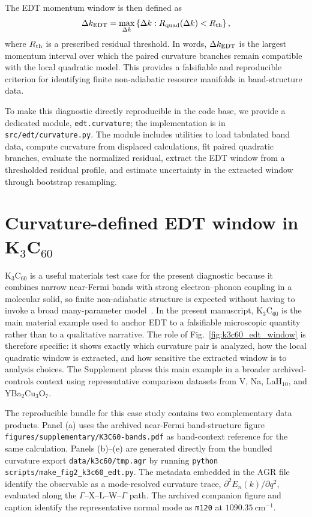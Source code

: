 \documentclass[twocolumn,10pt]{article}
\begin{document}
The EDT momentum window is then defined as
\begin{equation}
\Delta k_{\rm EDT}
=
\max_{\Delta k}
\left\{
\Delta k:
R_{\rm quad}(\Delta k)<R_{\rm th}
\right\},
\end{equation}
where $R_{\rm th}$ is a prescribed residual threshold. In words, $\Delta k_{\rm EDT}$ is the largest momentum interval over which the paired curvature branches remain compatible with the local quadratic model. This provides a falsifiable and reproducible criterion for identifying finite non-adiabatic resource manifolds in band-structure data.

To make this diagnostic directly reproducible in the code base, we provide a dedicated module, \texttt{edt.curvature}; the implementation is in \texttt{src/edt/curvature.py}. The module includes utilities to load tabulated band data, compute curvature from displaced calculations, fit paired quadratic branches, evaluate the normalized residual, extract the EDT window from a thresholded residual profile, and estimate uncertainty in the extracted window through bootstrap resampling.


\section{Curvature-defined EDT window in K$_3$C$_{60}$}

K$_3$C$_{60}$ is a useful materials test case for the present diagnostic because it combines narrow near-Fermi bands with strong electron--phonon coupling in a molecular solid, so finite non-adiabatic structure is expected without having to invoke a broad many-parameter model~\cite{Gunnarsson1997,Capone2009}. In the present manuscript, K$_3$C$_{60}$ is the main material example used to anchor EDT to a falsifiable microscopic quantity rather than to a qualitative narrative. The role of Fig.~\ref{fig:k3c60_edt_window} is therefore specific: it shows exactly which curvature pair is analyzed, how the local quadratic window is extracted, and how sensitive the extracted window is to analysis choices. The Supplement places this main example in a broader archived-controls context using representative comparison datasets from V, Na, LaH$_{10}$, and YBa$_2$Cu$_3$O$_7$.

The reproducible bundle for this case study contains two complementary data products. Panel (a) uses the archived near-Fermi band-structure figure \texttt{figures/supplementary/K3C60-bands.pdf} as band-context reference for the same calculation. Panels (b)--(e) are generated directly from the bundled curvature export \texttt{data/k3c60/tmp.agr} by running \texttt{python scripts/make\_fig2\_k3c60\_edt.py}. The metadata embedded in the AGR file identify the observable as a mode-resolved curvature trace, $\partial^2 E_n(k)/\partial q^2$, evaluated along the $\Gamma$--X--L--W--$\Gamma$ path. The archived companion figure and caption identify the representative normal mode as \texttt{m120} at $1090.35~\mathrm{cm}^{-1}$.
\end{document}

